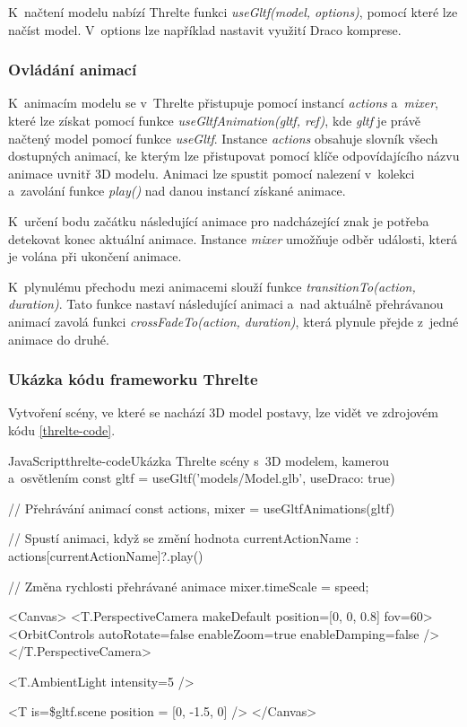 \documentclass[
  master,
  program=ainfvs,
  biblatex,
  figures=true,
  tables=false,
  sourcecodes=true,
  glossaries,
  index
]{kidiplom}
\begin{document}
            K~načtení modelu nabízí Threlte funkci \emph{useGltf(model, options)}, pomocí které lze načíst model. V~options lze například nastavit využití Draco komprese.


        \subsubsection{Ovládání animací} \label{ovladani-animaci}
            K~animacím modelu se v~Threlte přistupuje pomocí instancí \emph{actions} a~\emph{mixer}, které lze získat pomocí funkce \emph{useGltfAnimation(gltf, ref)}, kde \emph{gltf} je právě načtený model pomocí funkce \emph{useGltf}. Instance \emph{actions} obsahuje slovník všech dostupných animací, ke kterým lze přistupovat pomocí klíče odpovídajícího názvu animace uvnitř 3D modelu. Animaci lze spustit pomocí nalezení v~kolekci a~zavolání funkce \emph{play()} nad danou instancí získané animace.

            K~určení bodu začátku následující animace pro nadcházející znak je potřeba detekovat konec aktuální animace. Instance \emph{mixer} umožňuje odběr události, která je volána při ukončení animace.

            K~plynulému přechodu mezi animacemi slouží funkce \emph{transitionTo(action, duration)}. Tato funkce nastaví následující animaci a~nad aktuálně přehrávanou animací zavolá funkci \emph{crossFadeTo(action, duration)}, která plynule přejde z~jedné animace do druhé.


        \subsubsection{Ukázka kódu frameworku Threlte}
            Vytvoření scény, ve které se nachází 3D model postavy, lze vidět ve zdrojovém kódu \ref{threlte-code}.

            \begin{kicode}{JavaScript}{threlte-code}{Ukázka Threlte scény s~3D modelem, kamerou a~osvětlením}
const gltf = useGltf('models/Model.glb', {useDraco: true})

// Přehrávání animací
const { actions, mixer } = useGltfAnimations(gltf)

// Spustí animaci, když se změní hodnota currentActionName
$: $actions[currentActionName]?.play()

// Změna rychlosti přehrávané animace
mixer.timeScale = speed;

<Canvas>
    <T.PerspectiveCamera makeDefault position={[0, 0, 0.8]} fov={60}>
        <OrbitControls autoRotate={false} enableZoom={true} enableDamping={false} />
    </T.PerspectiveCamera>

    <T.AmbientLight intensity={5} />

    <T is={\$gltf.scene} position = {[0, -1.5, 0]} />
</Canvas>
            \end{kicode}
\end{document}
